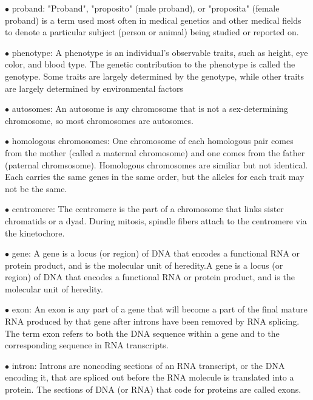 \documentclass{article}
\begin{document}
\vspace{0.1in}
$\bullet$ proband:
"Proband", "proposito" (male proband), or "proposita" (female proband) is a term used most often in medical genetics and other medical fields to denote a particular subject (person or animal) being studied or reported on.


\vspace{0.1in}
$\bullet$ phenotype:
A phenotype is an individual's observable traits, such as height, eye color, and blood type. The genetic contribution to the phenotype is called the genotype. Some traits are largely determined by the genotype, while other traits are largely determined by environmental factors


\vspace{0.1in}
$\bullet$ autosomes:
An autosome is any chromosome that is not a sex-determining chromosome, so most chromosomes are autosomes.


\vspace{0.1in}
$\bullet$ homologous chromosomes:
One chromosome of each homologous pair comes from the mother (called a maternal chromosome) and one comes from the father (paternal chromsosome). Homologous chromosomes are similiar but not identical. Each carries the same genes in the same order, but the alleles for each trait may not be the same.


\vspace{0.1in}
$\bullet$ centromere:
The centromere is the part of a chromosome that links sister chromatids or a dyad. During mitosis, spindle fibers attach to the centromere via the kinetochore. 


\vspace{0.1in}
$\bullet$ gene:
A gene is a locus (or region) of DNA that encodes a functional RNA or protein product, and is the molecular unit of heredity.A gene is a locus (or region) of DNA that encodes a functional RNA or protein product, and is the molecular unit of heredity.


\vspace{0.1in}
$\bullet$ exon:
An exon is any part of a gene that will become a part of the final mature RNA produced by that gene after introns have been removed by RNA splicing. The term exon refers to both the DNA sequence within a gene and to the corresponding sequence in RNA transcripts.


\vspace{0.1in}
$\bullet$ intron:
Introns are noncoding sections of an RNA transcript, or the DNA encoding it, that are spliced out before the RNA molecule is translated into a protein. The sections of DNA (or RNA) that code for proteins are called exons.
\end{document}

